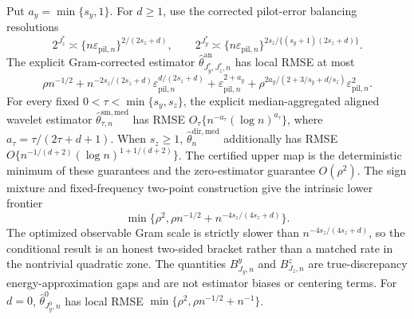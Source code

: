 Put \(a_y=\min\{s_y,1\}\). For \(d\ge1\), use the corrected pilot-error balancing resolutions
\[
2^{J_z^*}\asymp\{n\varepsilon_{\mathrm{pil},n}\}^{2/(2s_z+d)},
\qquad
2^{J_y^*}\asymp\{n\varepsilon_{\mathrm{pil},n}\}^{2s_z/\{(s_y+1)(2s_z+d)\}}.
\]
The explicit Gram-corrected estimator \(\widehat\theta^{\mathrm{an}}_{J_y^*,J_z^*,n}\) has local RMSE at most
\[
\rho n^{-1/2}
+n^{-2s_z/(2s_z+d)}\varepsilon_{\mathrm{pil},n}^{d/(2s_z+d)}
+\varepsilon_{\mathrm{pil},n}^{2+a_y}
+\rho^{2a_y/(2+3/s_y+d/s_z)}\varepsilon_{\mathrm{pil},n}^2.
\]
For every fixed \(0<\tau<\min\{s_y,s_z\}\), the explicit median-aggregated aligned wavelet estimator \(\widehat\theta^{\mathrm{sm,med}}_{\tau,n}\) has RMSE \(O_\tau\{n^{-a_\tau}(\log n)^{a_\tau}\}\), where \(a_\tau=\tau/(2\tau+d+1)\). When \(s_z\ge1\), \(\widehat\theta_n^{\mathrm{dir,med}}\) additionally has RMSE \(O\{n^{-1/(d+2)}(\log n)^{1+1/(d+2)}\}\). The certified upper map is the deterministic minimum of these guarantees and the zero-estimator guarantee \(O(\rho^2)\). The sign mixture and fixed-frequency two-point construction give the intrinsic lower frontier
\[
\min\{\rho^2,\rho n^{-1/2}+n^{-4s_z/(4s_z+d)}\}.
\]
The optimized observable Gram scale is strictly slower than \(n^{-4s_z/(4s_z+d)}\), so the conditional result is an honest two-sided bracket rather than a matched rate in the nontrivial quadratic zone.  The quantities \(B^y_{J_y,n}\) and \(B^z_{J_z,n}\) are true-discrepancy energy-approximation gaps and are not estimator biases or centering terms. For \(d=0\), \(\widehat\theta^0_{J_y^0,n}\) has local RMSE \(\min\{\rho^2,\rho n^{-1/2}+n^{-1}\}\).